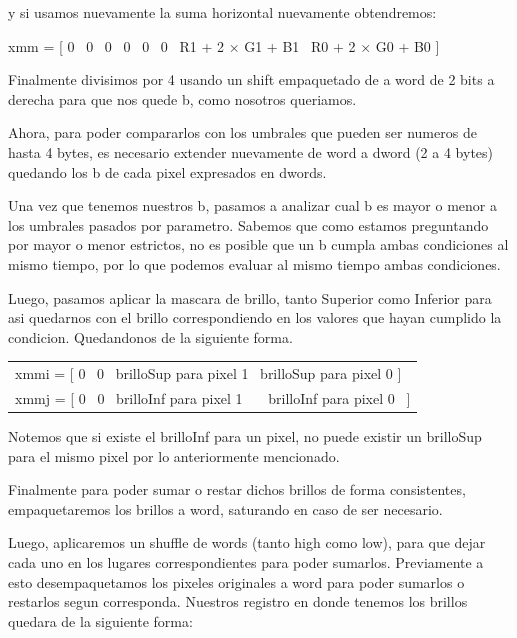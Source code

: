 \documentclass[a4paper]{article}
\begin{document}
y si usamos nuevamente la suma horizontal nuevamente obtendremos:

\begin{center}
	xmm = [ 0 \textpipe\ 0 \textpipe\ 0 \textpipe\ 0 \textpipe\ 0 \textpipe\ 0 \textpipe\ R1 + 2 $\times$ G1 + B1 \textpipe\ R0 + 2 $\times$ G0 + B0 ]
\end{center}

Finalmente divisimos por 4 usando un shift empaquetado de a word de 2 bits a derecha para que nos quede b, como nosotros queriamos.

Ahora, para poder compararlos con los umbrales que pueden ser numeros de hasta 4 bytes, es necesario extender nuevamente de word a dword (2 a 4 bytes) quedando los b de cada pixel expresados en dwords.

Una vez que tenemos nuestros b, pasamos a analizar cual b es mayor o menor a los umbrales pasados por parametro. Sabemos que como estamos preguntando por mayor o menor estrictos, no es posible que un b cumpla ambas condiciones al mismo tiempo, por lo que podemos evaluar al mismo tiempo ambas condiciones.

Luego, pasamos aplicar la mascara de brillo, tanto Superior como Inferior para asi quedarnos con el brillo correspondiendo en los valores que hayan cumplido la condicion. Quedandonos de la siguiente forma.

\begin{center}
	\begin{tabular}{l}
		xmmi = [ 0 \textpipe\ 0 \textpipe\ brilloSup para pixel 1 \textpipe\ brilloSup para pixel 0 ]\\
		xmmj = [ 0 \textpipe\ 0 \textpipe\ brilloInf para pixel 1 \ \ \textpipe\ brilloInf para pixel 0 \ ]
	\end{tabular}
	
\end{center}

Notemos que si existe el brilloInf para un pixel, no puede existir un brilloSup para el mismo pixel por lo anteriormente mencionado.

Finalmente para poder sumar o restar dichos brillos de forma consistentes, empaquetaremos los brillos a word, saturando en caso de ser necesario.

Luego, aplicaremos un shuffle de words (tanto high como low), para que dejar cada uno en los lugares correspondientes para poder sumarlos. Previamente a esto desempaquetamos los pixeles originales a word para poder sumarlos o restarlos segun corresponda. Nuestros registro en donde tenemos los brillos quedara de la siguiente forma:
\end{document}
